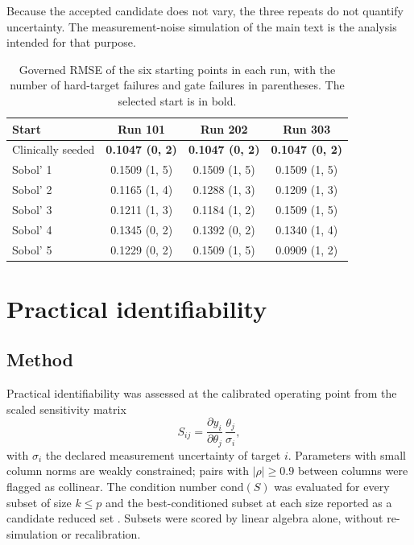 Because the accepted candidate does not vary, the three repeats do not
quantify uncertainty. The measurement-noise simulation of the main text is
the analysis intended for that purpose.

\begin{table}[h]
\centering
\caption{Governed RMSE of the six starting points in each run, with the
number of hard-target failures and gate failures in parentheses. The
selected start is in bold.}
\label{tab:S-multistart}
\begin{tabular}{lccc}
\toprule
Start & Run 101 & Run 202 & Run 303 \\
\midrule
Clinically seeded & \textbf{0.1047 (0, 2)} & \textbf{0.1047 (0, 2)} & \textbf{0.1047 (0, 2)} \\
Sobol' 1 & 0.1509 (1, 5) & 0.1509 (1, 5) & 0.1509 (1, 5) \\
Sobol' 2 & 0.1165 (1, 4) & 0.1288 (1, 3) & 0.1209 (1, 3) \\
Sobol' 3 & 0.1211 (1, 3) & 0.1184 (1, 2) & 0.1509 (1, 5) \\
Sobol' 4 & 0.1345 (0, 2) & 0.1392 (0, 2) & 0.1340 (1, 4) \\
Sobol' 5 & 0.1229 (0, 2) & 0.1509 (1, 5) & 0.0909 (1, 2) \\
\bottomrule
\end{tabular}
\end{table}

\section{Practical identifiability}
\label{sec:S-identifiability}

\subsection{Method}

Practical identifiability was assessed at the calibrated operating point from
the scaled sensitivity matrix \cite{pope2009,olufsen2013}
\begin{equation}
S_{ij} = \frac{\partial y_i}{\partial \theta_j}\,\frac{\theta_j}{\sigma_i},
\end{equation}
with $\sigma_i$ the declared measurement uncertainty of target $i$.
Parameters with small column norms are weakly constrained; pairs with
$|\rho| \ge 0.9$ between columns were flagged as collinear. The condition
number $\mathrm{cond}(S)$ was evaluated for every subset of size $k \le p$
and the best-conditioned subset at each size reported as a candidate reduced
set \cite{vanosta2020}. Subsets were scored by linear algebra alone, without
re-simulation or recalibration.

